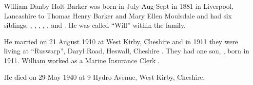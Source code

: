 
William Danby Holt Barker was born in July-Aug-Sept in 1881 \cite{WDHBarkerBirth} in Liverpool, Lancashire to Thomas Henry Barker  and Mary Ellen Moulsdale   and had six siblings: , , , , , and . He was called ``Will'' within the family.

He married  on 21 August 1910 at West Kirby, Cheshire\cite{CheshireParishRegisters} and in 1911 they were living at ``Ruswarp'', Daryl Road, Heswall, Cheshire \cite{WDHBarker1911}.  They had one son, , born in 1911. William worked as a Marine Insurance Clerk \cite{WDHBarker1911}.

He died on 29 May 1940 at 9 Hydro Avenue, West Kirby, Cheshire.
